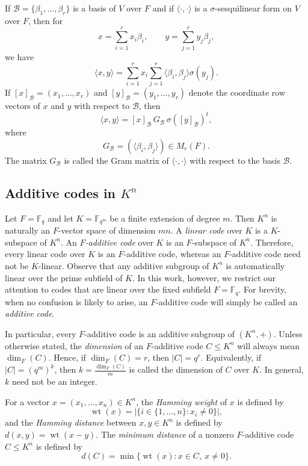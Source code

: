 \documentclass[11pt]{article}
\begin{document}
If $\mathcal{B}=\{\beta_1,\ldots,\beta_r\}$ is a basis of $V$ over $F$ and if $\langle\cdot,\cdot\rangle$ is a $\sigma$-sesquilinear form on $V$ over $F$, then for
$$
x=\sum_{i=1}^r x_i\beta_i,\qquad y=\sum_{j=1}^r y_j\beta_j,
$$
we have
$$
\langle x,y\rangle
=
\sum_{i=1}^r x_i\sum_{j=1}^r \langle \beta_i,\beta_j\rangle \sigma(y_j).
$$
If $[x]_{\mathcal B}=(x_1,\ldots,x_r)$ and $[y]_{\mathcal B}=(y_1,\ldots,y_r)$ denote the coordinate row vectors of $x$ and $y$ with respect to $\mathcal B$, then
$$
\langle x,y\rangle=[x]_{\mathcal B}\,G_{\mathcal B}\,\sigma([y]_{\mathcal B})^t,
$$
where
$$
G_{\mathcal B}=(\langle \beta_i,\beta_j\rangle)\in M_r(F).
$$
The matrix $G_{\mathcal B}$ is called the Gram matrix of $\langle\cdot,\cdot\rangle$ with respect to the basis $\mathcal B$.



\subsection{Additive codes in $K^n$}

Let $F=\mathbb{F}_q$ and let $K=\mathbb{F}_{q^m}$ be a finite extension of degree $m$. Then $K^n$ is naturally an $F$-vector space of dimension $mn$. A \textit{linear code} over $K$ is a $K$-subspace of $K^n$. An \textit{$F$-additive code} over $K$ is an $F$-subspace of $K^n$. Therefore, every linear code over $K$ is an $F$-additive code, whereas an $F$-additive code need not be $K$-linear. Observe that any additive subgroup of $K^n$ is automatically linear over the prime subfield of $K$. In this work, however, we restrict our attention to codes that are linear over the fixed subfield $F=\mathbb{F}_q$. For brevity, when no confusion is likely to arise, an $F$-additive code will simply be called an \textit{additive code}.

In particular, every $F$-additive code is an additive subgroup of $(K^n,+)$. Unless otherwise stated, the \textit{dimension} of an $F$-additive code $C\leq K^n$ will always mean $\dim_F(C)$. Hence, if $\dim_F(C)=r$, then
$
|C|=q^r.
$
Equivalently, if $|C|=(q^m)^k$, then
$
k=\frac{\dim_F(C)}{m}
$
is called the dimension of $C$ over $K$. In general, $k$ need not be an integer.

For a vector $x=(x_1,\dots,x_n)\in K^n$, the \textit{Hamming weight} of $x$ is defined by
$$
\operatorname{wt}(x)=|\{i\in\{1,\dots,n\}:x_i\neq 0\}|,
$$
and the \textit{Hamming distance} between $x,y\in K^n$ is defined by
$
d(x,y)=\operatorname{wt}(x-y).
$
The \textit{minimum distance} of a nonzero $F$-additive code $C\leq K^n$ is defined by
$$
d(C)=\min\{\operatorname{wt}(x):x\in C,\ x\neq 0\}.
$$
\end{document}
